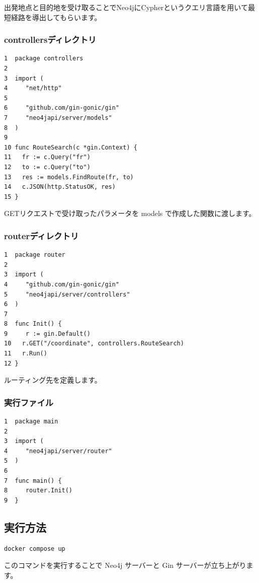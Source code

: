 出発地点と目的地を受け取ることでNeo4jにCypherというクエリ言語を用いて最短経路を導出してもらいます。
\subsubsection{controllersディレクトリ}

\begin{tcolorbox}[title=coordinate\_controller.go]
\begin{verbatim}
1  package controllers
2
3  import (
4	  "net/http"
5
6	  "github.com/gin-gonic/gin"
7	  "neo4japi/server/models"
8  )
9
10 func RouteSearch(c *gin.Context) {
11	 fr := c.Query("fr")
12	 to := c.Query("to")
13	 res := models.FindRoute(fr, to)
14	 c.JSON(http.StatusOK, res)
15 }
\end{verbatim}
\end{tcolorbox}
GETリクエストで受け取ったパラメータを models で作成した関数に渡します。
\subsubsection{routerディレクトリ}

\begin{tcolorbox}[title=router.go]
\begin{verbatim}
1  package router
2
3  import (
4	  "github.com/gin-gonic/gin"
5	  "neo4japi/server/controllers"
6  )
7
8  func Init() {
9	  r := gin.Default()
10	 r.GET("/coordinate", controllers.RouteSearch)
11	 r.Run()
12 }
\end{verbatim}
\end{tcolorbox}
ルーティング先を定義します。
\subsubsection{実行ファイル}
\begin{tcolorbox}[title=coordinate\_controller.go]
\begin{verbatim}
1  package main
2
3  import (
4	  "neo4japi/server/router"
5  )
6
7  func main() {
8	  router.Init()
9  }
\end{verbatim}
\end{tcolorbox}

\subsection{実行方法}
\begin{tcolorbox}[breakable]
\begin{verbatim}
docker compose up
\end{verbatim}
\end{tcolorbox}
このコマンドを実行することで Neo4j サーバーと Gin サーバーが立ち上がります。
